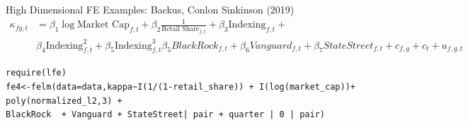 \begin{frame}[fragile]{High Dimensional FE Examples: Backus, Conlon Sinkinson (2019)}
\footnotesize
\begin{align*}
\kappa_{fg,t} &= \beta_1 \log \text{Market Cap}_{f,t} + \beta_2\frac{1}{\text{Retail Share}_{f,t}} + \beta_3\text{Indexing}_{f,t} +\\
&\beta_4 \text{Indexing}_{f,t}^2 + \beta_5 \text{Indexing}_{f,t}^3 \beta_5 BlackRock_{f,t} + \beta_6 Vanguard_{f,t} + \beta_7 StateStreet_{f,t} 
 + c_{f,g} + c_t + u_{f,g,t}
\end{align*}

\tiny
\begin{verbatim}
require(lfe)
fe4<-felm(data=data,kappa~I(1/(1-retail_share)) + I(log(market_cap))+ poly(normalized_l2,3) + 
BlackRock  + Vanguard + StateStreet| pair + quarter | 0 | pair)
\end{verbatim}
\end{frame}

